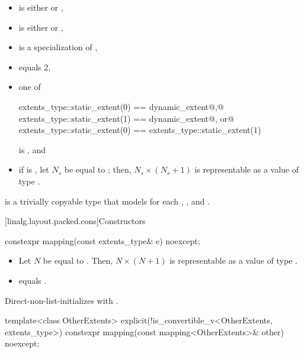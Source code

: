 \begin{itemdescr}
\pnum
\mandates
\begin{itemize}
\item
{} is either  or ,
\item
{} is either  or ,
\item
{} is a specialization of ,
\item
{} equals 2,
\item
one of
\begin{codeblock}
extents_type::static_extent(0) == dynamic_extent@\textrm{,}@
extents_type::static_extent(1) == dynamic_extent@\textrm{, or}@
extents_type::static_extent(0) == extents_type::static_extent(1)
\end{codeblock}
is , and
\item
if  is ,
let $N_s$ be equal to ; then,
$N_s \times (N_s + 1)$ is representable as a value of type .
\end{itemize}

\pnum
{} is a trivially copyable type
that models  for each , , and .
\end{itemdescr}

[linalg.layout.packed.cons]{Constructors}

\begin{itemdecl}
constexpr mapping(const extents_type& e) noexcept;
\end{itemdecl}

\begin{itemdescr}
\pnum
\expects
\begin{itemize}
\item
Let $N$ be equal to .
Then, $N \times (N+1)$ is representable as
a value of type .
\item
{} equals .
\end{itemize}

\pnum
\effects
Direct-non-list-initializes  with .
\end{itemdescr}

\begin{itemdecl}
template<class OtherExtents>
  explicit(!is_convertible_v<OtherExtents, extents_type>)
    constexpr mapping(const mapping<OtherExtents>& other) noexcept;
\end{itemdecl}

